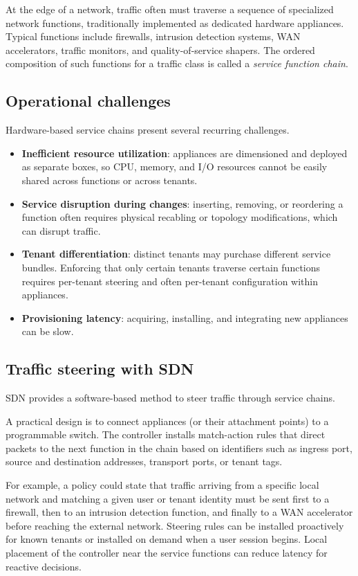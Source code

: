 \documentclass[11pt,a4paper,openany]{report}
\begin{document}
At the edge of a network, traffic often must traverse a sequence of specialized network functions, traditionally implemented as dedicated hardware appliances. Typical functions include firewalls, intrusion detection systems, WAN accelerators, traffic monitors, and quality-of-service shapers. The ordered composition of such functions for a traffic class is called a \emph{service function chain}.

\subsection{Operational challenges}

Hardware-based service chains present several recurring challenges.

\begin{itemize}
\item \textbf{Inefficient resource utilization}: appliances are dimensioned and deployed as separate boxes, so CPU, memory, and I/O resources cannot be easily shared across functions or across tenants.
\item \textbf{Service disruption during changes}: inserting, removing, or reordering a function often requires physical recabling or topology modifications, which can disrupt traffic.
\item \textbf{Tenant differentiation}: distinct tenants may purchase different service bundles. Enforcing that only certain tenants traverse certain functions requires per-tenant steering and often per-tenant configuration within appliances.
\item \textbf{Provisioning latency}: acquiring, installing, and integrating new appliances can be slow.
\end{itemize}

\subsection{Traffic steering with SDN}

SDN provides a software-based method to steer traffic through service chains.

A practical design is to connect appliances (or their attachment points) to a programmable switch. The controller installs match-action rules that direct packets to the next function in the chain based on identifiers such as ingress port, source and destination addresses, transport ports, or tenant tags.

For example, a policy could state that traffic arriving from a specific local network and matching a given user or tenant identity must be sent first to a firewall, then to an intrusion detection function, and finally to a WAN accelerator before reaching the external network. Steering rules can be installed proactively for known tenants or installed on demand when a user session begins. Local placement of the controller near the service functions can reduce latency for reactive decisions.
\end{document}

